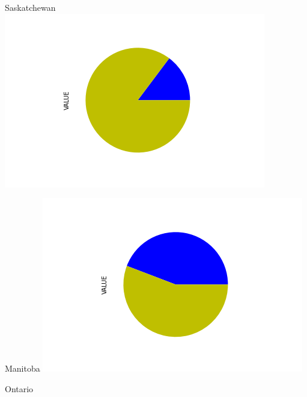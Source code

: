 \documentclass{beamer}
\begin{document}
\begin{frame}
\begin{minipage}[b]{0.2\textwidth}
\begin{center}
\tiny{Saskatchewan}
\includegraphics[width=\textwidth, trim={120pt 50pt 110pt 50pt}, clip]{../Saskatchewan.png}%
\end{center}
\end{minipage}%
%
\begin{minipage}[b]{0.2\textwidth}
\begin{center}
\tiny{Manitoba}
\includegraphics[width=\textwidth, trim={120pt 50pt 110pt 50pt}, clip]{../Manitoba.png}%
\end{center}
\end{minipage}%
%
\begin{minipage}[b]{0.2\textwidth}
\begin{center}
\tiny{Ontario}

\end{center}
\end{minipage}
\end{frame}
\end{document}
